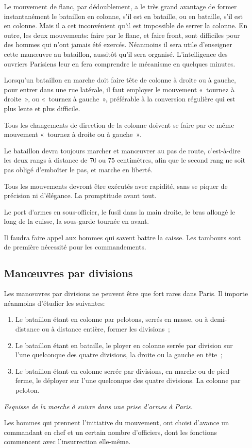 \documentclass[french,twoside]{book} %
\begin{document}
\begin{enumerate}[itemsep=0pt,]
\end{enumerate}\noindent Le mouvement de flanc, par dédoublement, a le très grand avantage de former instantanément le bataillon en colonne, s’il est en bataille, ou en bataille, s’il est en colonne. Mais il a cet inconvénient qu’il est impossible de serrer la colonne. En outre, les deux mouvements: faire par le flanc, et faire front, sont difficiles pour des hommes qui n’ont jamais été exercés. Néanmoins il sera utile d’enseigner cette manœuvre au bataillon, aussitôt qu’il sera organisé. L'intelligence des ouvriers Parisiens leur en fera comprendre le mécanisme en quelques minutes.\par
Lorsqu’un bataillon en marche doit faire tête de colonne à droite ou à gauche, pour entrer dans une rue latérale, il faut employer le mouvement « tournez à droite », ou « tournez à gauche », préférable à la conversion régulière qui est plus lente et plus difficile.\par
Tous les changements de direction de la colonne doivent se faire par ce même mouvement « tournez à droite ou à gauche ».\par
Le bataillon devra toujours marcher et manœuvrer au pas de route, c’est-à-dire les deux rangs à distance de 70 ou 75 centimètres, afin que le second rang ne soit pas obligé d’emboîter le pas, et marche en liberté.\par
Tous les mouvements devront être exécutés avec rapidité, sans se piquer de précision ni d’élégance. La promptitude avant tout.\par
Le port d’armes en sous-officier, le fusil dans la main droite, le bras allongé le long de la cuisse, la sous-garde tournée en avant.\par
Il faudra faire appel aux hommes qui savent battre la caisse. Les tambours sont de première nécessité pour les commandements.
\subsection[Manœuvres par divisions]{Manœuvres par divisions}
\noindent Les manœuvres par divisions ne peuvent être que fort rares dans Paris. Il importe néanmoins d’étudier les suivantes:\par

\begin{enumerate}[itemsep=0pt,]
\item Le bataillon étant en colonne par pelotons, serrés en masse, ou à demi-distance ou à distance entière, former les divisions ;
\item Le bataillon étant en bataille, le ployer en colonne serrée par division sur l’une quelconque des quatre divisions, la droite ou la gauche en tête ;
\item Le bataillon étant en colonne serrée par divisions, en marche ou de pied ferme, le déployer sur l’une quelconque des quatre divisions. La colonne par peloton.

\end{enumerate}\noindent \emph{Esquisse de la marche à suivre dans une prise d’armes à Paris.}\par
Les hommes qui prennent l’initiative du mouvement, ont choisi d’avance un commandant en chef et un certain nombre d’officiers, dont les fonctions commencent avec l’insurrection elle-même.
\end{document}
